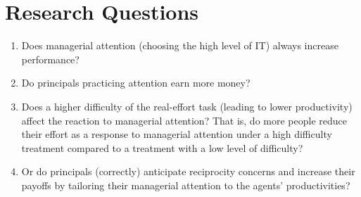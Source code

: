 \section{Research Questions}
\begin{enumerate}
      \item Does managerial attention (choosing the high level of IT) always increase performance?
      \item Do principals practicing attention earn more money?
      \item Does a higher difficulty of the real-effort task (leading to lower productivity) affect the
       reaction to managerial attention? That is, do more people reduce their effort as a response to 
       managerial attention under a high difficulty treatment compared to a treatment with a low level of 
       difficulty?
      \item Or do principals (correctly) anticipate reciprocity concerns and increase their payoffs by 
      tailoring their managerial attention to the agents' productivities? 
      
\end{enumerate}




